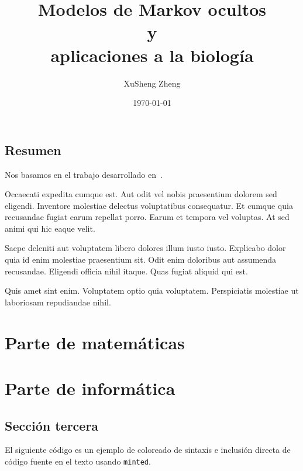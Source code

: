 \documentclass[oneside,openright,titlepage,numbers=noenddot,openany,headinclude,footinclude=true,
cleardoublepage=empty,abstract=false,BCOR=5mm,paper=a4,fontsize=12pt,main=spanish]{scrreprt}
\author{XuSheng Zheng}
\date{\today}
\title{Modelos de Markov ocultos\\ y \\aplicaciones a la biología}
\begin{document}
\maketitle
\tableofcontents


\chapter*{Resumen}


Nos basamos en el trabajo desarrollado en~\cite{turing1936a}.

Occaecati expedita cumque est. Aut odit vel nobis praesentium dolorem
sed eligendi. Inventore molestiae delectus voluptatibus
consequatur. Et cumque quia recusandae fugiat earum repellat
porro. Earum et tempora vel voluptas. At sed animi qui hic eaque
velit.

Saepe deleniti aut voluptatem libero dolores illum iusto
iusto. Explicabo dolor quia id enim molestiae praesentium sit. Odit
enim doloribus aut assumenda recusandae. Eligendi officia nihil
itaque. Quas fugiat aliquid qui est.

Quis amet sint enim. Voluptatem optio quia voluptatem. Perspiciatis
molestiae ut laboriosam repudiandae nihil.


\part{Parte de matemáticas}




\part{Parte de informática}
\chapter{Sección tercera}
El siguiente código es un ejemplo de coloreado de sintaxis e inclusión
directa de código fuente en el texto usando \texttt{minted}.
\end{document}
